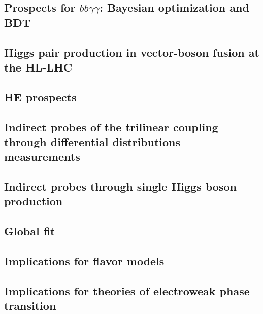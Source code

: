 \documentclass[../report.tex]{subfiles}
\providecommand{\main}{..}
\begin{document}
\subsection{Prospects for $bb\gamma\gamma $: Bayesian optimization and BDT}





\subsection{Higgs pair production in vector-boson fusion at the HL-LHC}









\subsection{HE prospects}





\subsection{Indirect probes of the trilinear coupling through differential distributions measurements}

\subsection{Indirect probes through single Higgs boson production}



\subsection{Global fit}




\subsection{Implications for flavor models}



\subsection{Implications for theories of electroweak phase transition}
\end{document}

